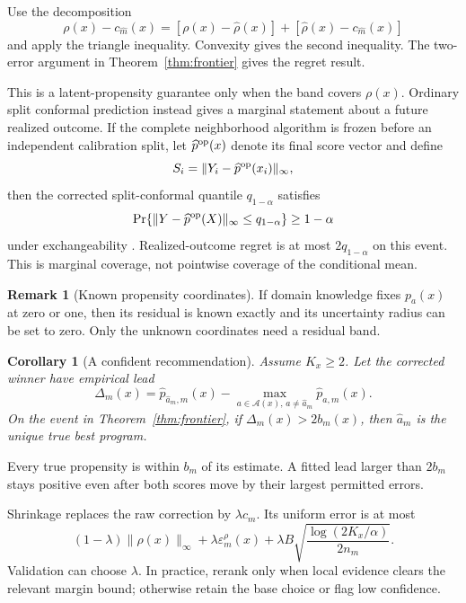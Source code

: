 \documentclass[10pt]{article}
\makeatletter
\theoremstyle{noteplain}
\newtheorem{corollary}[theorem]{Corollary}
\theoremstyle{definition}
\newtheorem{remark}[theorem]{Remark}
\renewenvironment{proof}[1][\proofname]{\par
  \pushQED{\qed}%
  \normalfont \topsep4\p@\@plus4\p@\relax
  \trivlist
  \item[\hskip\labelsep\bfseries #1\@addpunct{.}]\ignorespaces
}{\popQED\endtrivlist\@endpefalse}
\newcommand{\cA}{\mathcal A}
\makeatother
\begin{document}
\begin{proof}
Use the decomposition
\[
 \rho(x)-c_{\widehat m}(x)
 =[\rho(x)-\widehat\rho(x)]+[\widehat\rho(x)-c_{\widehat m}(x)]
\]
and apply the triangle inequality. Convexity gives the second inequality. The two-error argument in Theorem~\ref{thm:frontier} gives the regret result.
\end{proof}

This is a latent-propensity guarantee only when the band covers $\rho(x)$. Ordinary split conformal prediction instead gives a marginal statement about a future realized outcome. If the complete neighborhood algorithm is frozen before an independent calibration split, let $\widehat p^{\rm op}(x)$ denote its final score vector and define
\[
 S_i=\|Y_i-\widehat p^{\rm op}(x_i)\|_\infty,
\]
then the corrected split-conformal quantile $q_{1-\alpha}$ satisfies
\begin{equation}\label{eq:conformal}
 \Pr\{\|Y-\widehat p^{\rm op}(X)\|_\infty\le q_{1-\alpha}\}\ge1-\alpha
\end{equation}
under exchangeability \cite{shafer}. Realized-outcome regret is at most $2q_{1-\alpha}$ on this event. This is marginal coverage, not pointwise coverage of the conditional mean.

\begin{remark}[Known propensity coordinates]\label{rem:known}
If domain knowledge fixes $p_a(x)$ at zero or one, then its residual is known exactly and its uncertainty radius can be set to zero. Only the unknown coordinates need a residual band.
\end{remark}

\begin{corollary}[A confident recommendation]\label{cor:margin}
Assume $K_x\ge2$. Let the corrected winner have empirical lead
\[
 \Delta_m(x)=\widehat p_{\widehat a_m,m}(x)
 -\max_{a\in\cA(x),\,a\ne\widehat a_m}\widehat p_{a,m}(x).
\]
On the event in Theorem~\ref{thm:frontier}, if $\Delta_m(x)>2b_m(x)$, then $\widehat a_m$ is the unique true best program.
\end{corollary}

\begin{proof}
Every true propensity is within $b_m$ of its estimate. A fitted lead larger than $2b_m$ stays positive even after both scores move by their largest permitted errors.
\end{proof}

Shrinkage replaces the raw correction by $\lambda c_m$. Its uniform error is at most
\[
 (1-\lambda)\|\rho(x)\|_\infty
 +\lambda\varepsilon_m^\rho(x)
 +\lambda B\sqrt{\frac{\log(2K_x/\alpha)}{2n_m}}.
\]
Validation can choose $\lambda$. In practice, rerank only when local evidence clears the relevant margin bound; otherwise retain the base choice or flag low confidence.
\end{document}
